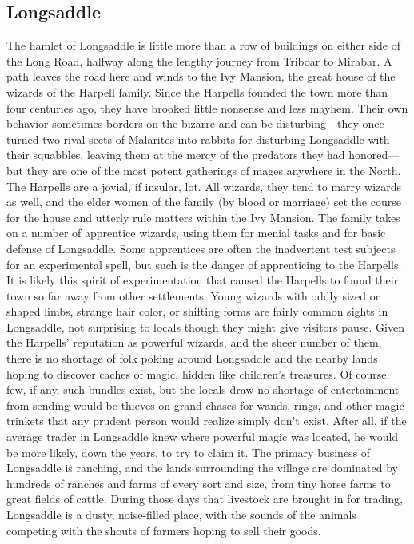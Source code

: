 \documentclass[10pt,a4paper,twoside,twocolumn,openany,bg=print,nodeprecatedcode]{dndbook}
\begin{document}
\subsection{Longsaddle}
The hamlet of Longsaddle is little more than a row of buildings on either side of the Long Road, halfway along the lengthy journey from Triboar to Mirabar. A path leaves the road here and winds to the Ivy Mansion, the great house of the wizards of the Harpell family. Since the Harpells founded the town more than four centuries ago, they have brooked little nonsense and less mayhem. Their own behavior sometimes borders on the bizarre and can be disturbing—they once turned two rival sects of Malarites into rabbits for disturbing Longsaddle with their squabbles, leaving them at the mercy of the predators they had honored—but they are one of the most potent gatherings of mages anywhere in the North.
The Harpells are a jovial, if insular, lot. All wizards, they tend to marry wizards as well, and the elder women of the family (by blood or marriage) set the course for the house and utterly rule matters within the Ivy Mansion. The family takes on a number of apprentice wizards, using them for menial tasks and for basic defense of Longsaddle. Some apprentices are often the inadvertent test subjects for an experimental spell, but such is the danger of apprenticing to the Harpells. It is likely this spirit of experimentation that caused the Harpells to found their town so far away from other settlements. Young wizards with oddly sized or shaped limbs, strange hair color, or shifting forms are fairly common sights in Longsaddle, not surprising to locals though they might give visitors pause.
Given the Harpells' reputation as powerful wizards, and the sheer number of them, there is no shortage of folk poking around Longsaddle and the nearby lands hoping to discover caches of magic, hidden like children's treasures. Of course, few, if any, such bundles exist, but the locals draw no shortage of entertainment from sending would-be thieves on grand chases for wands, rings, and other magic trinkets that any prudent person would realize simply don't exist. After all, if the average trader in Longsaddle knew where powerful magic was located, he would be more likely, down the years, to try to claim it.
The primary business of Longsaddle is ranching, and the lands surrounding the village are dominated by hundreds of ranches and farms of every sort and size, from tiny horse farms to great fields of cattle. During those days that livestock are brought in for trading, Longsaddle is a dusty, noise-filled place, with the sounds of the animals competing with the shouts of farmers hoping to sell their goods.
\end{document}
